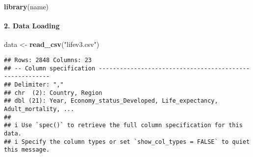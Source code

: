 \documentclass[
]{article}
\newenvironment{Shaded}{\begin{snugshade}}{\end{snugshade}}
\newcommand{\FunctionTok}[1]{\textcolor[rgb]{0.13,0.29,0.53}{\textbf{#1}}}
\newcommand{\NormalTok}[1]{#1}
\newcommand{\OtherTok}[1]{\textcolor[rgb]{0.56,0.35,0.01}{#1}}
\newcommand{\StringTok}[1]{\textcolor[rgb]{0.31,0.60,0.02}{#1}}
\begin{document}
\begin{Shaded}
\begin{Highlighting}[]
\FunctionTok{library}\NormalTok{(name)}
\end{Highlighting}
\end{Shaded}

\hypertarget{data-loading}{%
\paragraph{2. Data Loading}\label{data-loading}}

\begin{Shaded}
\begin{Highlighting}[]
\NormalTok{data }\OtherTok{\textless{}{-}} \FunctionTok{read\_csv}\NormalTok{(}\StringTok{"lifev3.csv"}\NormalTok{)}
\end{Highlighting}
\end{Shaded}

\begin{verbatim}
## Rows: 2848 Columns: 23
## -- Column specification --------------------------------------------------------
## Delimiter: ","
## chr  (2): Country, Region
## dbl (21): Year, Economy_status_Developed, Life_expectancy, Adult_mortality, ...
## 
## i Use `spec()` to retrieve the full column specification for this data.
## i Specify the column types or set `show_col_types = FALSE` to quiet this message.
\end{verbatim}
\end{document}
